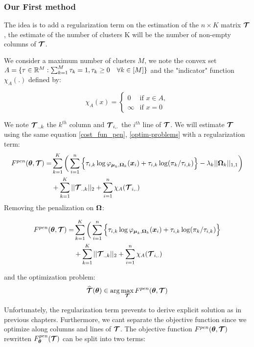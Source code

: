 \subsubsection{Our First method}

The idea is to add a regularization term on the estimation of the $n\times K$ matrix $\boldsymbol{\mathcal T}$, the estimate of the number of clusters K will be the number of non-empty columns of $\boldsymbol{\mathcal T}$.\

We consider a maximum number of clusters $M$, we note the convex set $A=\{\tau \in {\mathbb R}^M : \sum_{k=1}^M\tau_k=1, \tau_k\geq 0 \quad \forall k \in [M] \}$ and the "indicator" function $\chi_A(.)$ defined by:


  \begin{equation*}
    \chi_A(x) =
    \begin{cases}
      0 & \text{if } x \in A,\\
        \infty & \text{if } x = 0
    \end{cases}
\end{equation*}

We note $\boldsymbol{\mathcal T}_{.,k}$ the $k^{th}$ column and $\boldsymbol{\mathcal T}_{i,.}$ the $i^{th}$ line of $\boldsymbol{\mathcal T}$. We will estimate $\boldsymbol{\mathcal T}$ using the same equation \ref{cost_fun_pen}, \ref{optim-problems} with a regularization term:\\
\begin{align*}
F^{pen}({\boldsymbol\theta},\boldsymbol{\mathcal T})  =& \sum_{k=1}^K \bigg(\sum_{i=1}^{n} \Big\{\tau_{i,k}\log\varphi_{\boldsymbol\mu_{k},\boldsymbol\Omega_{k}}(\boldsymbol x_i)+\tau_{i,k}
    \log(\pi_k/\tau_{i,k})\Big\}-\lambda_k||\boldsymbol\Omega_k||_{1,1}\bigg)\\ 
    &+ \sum_{k=1}^K ||\boldsymbol{\mathcal T}_{.,k}||_{2} + \sum_{i=1}^{n} \chi_A(\boldsymbol{\mathcal T}_{i,.})
\end{align*}
Removing the penalization on $\boldsymbol\Omega$:

\begin{align*}
F^{pen}({\boldsymbol\theta},\boldsymbol{\mathcal T})  =& \sum_{k=1}^K \bigg(\sum_{i=1}^{n} \Big\{\tau_{i,k}\log\varphi_{\boldsymbol\mu_{k},\boldsymbol\Omega_{k}}(\boldsymbol x_i)+\tau_{i,k}
    \log(\pi_k/\tau_{i,k})\Big\}\\ 
    &+ \sum_{k=1}^K ||\boldsymbol{\mathcal T}_{.,k}||_{2} + \sum_{i=1}^{n} \chi_A(\boldsymbol{\mathcal T}_{i,.})
\end{align*}

 and the optimization problem:
\begin{equation}
\widehat{\boldsymbol{\mathcal T}}({\boldsymbol\theta})\in \arg\max_{\boldsymbol{\mathcal T}} F^{pen}({\boldsymbol\theta},\boldsymbol{\mathcal T})
\end{equation}

Unfortunately, the regularization term prevents to derive explicit solution as in previous chapters. Furthermore, we cant separate the objective function since we optimize along columns and lines of $\boldsymbol{\mathcal T}$. The objective function $F^{pen}({\boldsymbol\theta},\boldsymbol{\mathcal T})$ rewritten
$F^{pen}_{{\boldsymbol\theta}}(\boldsymbol{\mathcal T})$ can be split into two terms:

